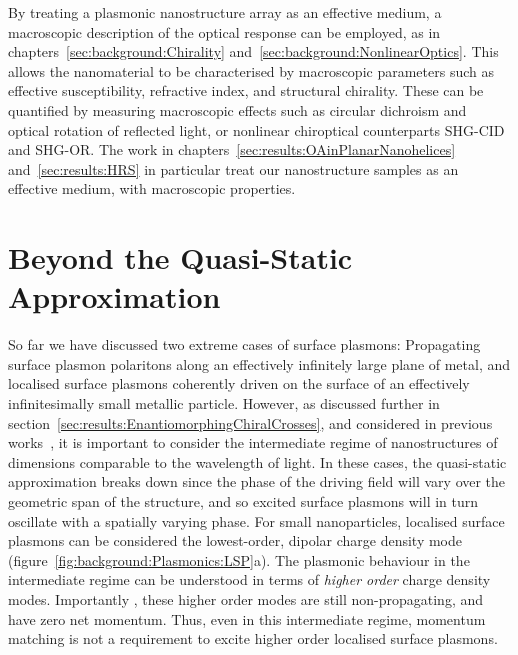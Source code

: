 By treating a plasmonic nanostructure array as an effective medium, a macroscopic description of the optical response can be employed, as in chapters~\ref{sec:background:Chirality} and~\ref{sec:background:NonlinearOptics}. This allows the nanomaterial to be characterised by macroscopic parameters such as effective susceptibility, refractive index, and structural chirality. These can be quantified by measuring macroscopic effects such as circular dichroism and optical rotation of reflected light, or nonlinear chiroptical counterparts SHG-CID and SHG-OR. The work in chapters~\ref{sec:results:OAinPlanarNanohelices} and~\ref{sec:results:HRS} in particular treat our nanostructure samples as an effective medium, with macroscopic properties.

\section{Beyond the Quasi-Static Approximation}\label{sec:background:Plasmonics:Intermediate}
So far we have discussed two extreme cases of surface plasmons: Propagating surface plasmon polaritons along an effectively infinitely large plane of metal, and localised surface plasmons coherently driven on the surface of an effectively infinitesimally small metallic particle. However, as discussed further in section~\ref{sec:results:EnantiomorphingChiralCrosses}, and considered in previous works~\cite{Valev2011b, Valev2014}, it is important to consider the intermediate regime of nanostructures of dimensions comparable to the wavelength of light. In these cases, the quasi-static approximation breaks down since the phase of the driving field will vary over the geometric span of the structure, and so excited surface plasmons will in turn oscillate with a spatially varying phase. For small nanoparticles, localised surface plasmons can be considered the lowest-order, dipolar charge density mode (figure~\ref{fig:background:Plasmonics:LSP}a). The plasmonic behaviour in the intermediate regime can be understood in terms of \textit{higher order} charge density modes. Importantly , these higher order modes are still non-propagating, and have zero net momentum. Thus, even in this intermediate regime, momentum matching is not a requirement to excite higher order localised surface plasmons.
